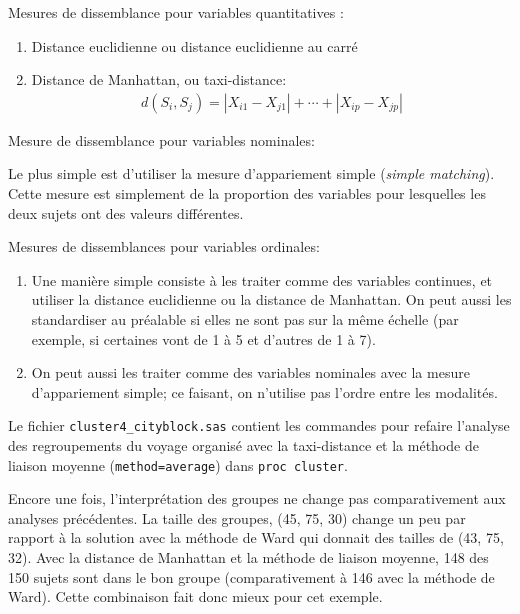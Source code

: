 \documentclass[
  11pt,
  letterpaper,
]{book}
\providecommand{\tightlist}{%
  \setlength{\itemsep}{0pt}\setlength{\parskip}{0pt}}
\theoremstyle{definition}
\theoremstyle{definition}
\theoremstyle{definition}
\theoremstyle{remark}
\begin{document}
Mesures de dissemblance pour variables quantitatives :

\begin{enumerate}
\def\labelenumi{\arabic{enumi})}
\tightlist
\item
  Distance euclidienne ou distance euclidienne au carré
\item
  Distance de Manhattan, ou taxi-distance:
  \begin{align*}
  d(S_i, S_j) = |X_{i1}-X_{j1}| + \cdots + |X_{ip}- X_{jp}|
  \end{align*}
\end{enumerate}

Mesure de dissemblance pour variables nominales:

Le plus simple est d'utiliser la mesure d'appariement simple (\emph{simple matching}). Cette mesure est simplement de la proportion des variables pour lesquelles les deux sujets ont des valeurs différentes.

Mesures de dissemblances pour variables ordinales:

\begin{enumerate}
\def\labelenumi{\arabic{enumi})}
\tightlist
\item
  Une manière simple consiste à les traiter comme des variables continues, et utiliser la distance euclidienne ou la distance de Manhattan. On peut aussi les standardiser au préalable si elles ne sont pas sur la même échelle (par exemple, si certaines vont de 1 à 5 et d'autres de 1 à 7).
\item
  On peut aussi les traiter comme des variables nominales avec la mesure d'appariement simple; ce faisant, on n'utilise pas l'ordre entre les modalités.
\end{enumerate}

Le fichier \texttt{cluster4\_cityblock.sas} contient les commandes pour refaire l'analyse des regroupements du voyage organisé avec la taxi-distance et la méthode de liaison moyenne (\texttt{method=average}) dans \texttt{proc\ cluster}.

Encore une fois, l'interprétation des groupes ne change pas comparativement aux analyses précédentes. La taille des groupes, (45, 75, 30) change un peu par rapport à la solution avec la méthode de Ward qui donnait des tailles de (43, 75, 32). Avec la distance de Manhattan et la méthode de liaison moyenne, 148 des 150 sujets sont dans le bon groupe (comparativement à 146 avec la méthode de Ward). Cette combinaison fait donc mieux pour cet exemple.
\end{document}
